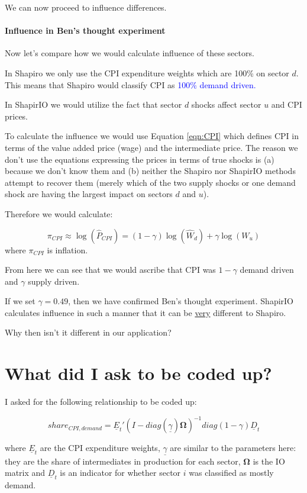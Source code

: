 \documentclass[12pt,english]{article}
\begin{document}
We can now proceed to influence differences.

\paragraph{Influence in Ben's thought experiment}

Now let's compare how we would calculate influence of these sectors.

In Shapiro we only use the CPI expenditure weights which are 100\% on sector $d$. This means that Shapiro would classify CPI as \textcolor{blue}{100\% demand driven.}

In ShapirIO we would utilize the fact that sector $d$ shocks affect sector $u$ and CPI prices. 

To calculate the influence we would use Equation \ref{eqn:CPI} which defines CPI in terms of the value added price (wage) and the intermediate price. The reason we don't use the equations expressing the prices in terms of true shocks is (a) because we don't know them and (b) neither the Shapiro nor ShapirIO methods attempt to recover them (merely which of the two supply shocks or one demand shock are having the largest impact on sectors $d$ and $u$). 

Therefore we would calculate:

\[
\pi_{CPI} \approx \log(\hat{P}_{CPI}) = (1-\gamma)\log(\hat{W}_d) + \gamma \log(W_u)
\]
where $\pi_{CPI}$ is inflation.

From here we can see that we would ascribe that CPI was $1-\gamma$ demand driven and $\gamma$ supply driven.

If we set $\gamma=0.49$, then we have confirmed Ben's thought experiment. ShapirIO calculates influence in such a manner that it can be \underline{very} different to Shapiro.

Why then isn't it different in our application? 

\section*{What did I ask to be coded up?}

I asked for the following relationship to be coded up:

\[
share_{CPI,demand}= \underline{E}_t' (I-diag(\underline{\gamma})\mathbf{\Omega})^{-1} diag(1-\gamma) \underline{D}_t
\]

where $\underline{E}_t$ are the CPI expenditure weights, $\underline{\gamma}$ are similar to the parameters here: they are the share of intermediates in production for each sector, $\mathbf{\Omega}$ is the IO matrix and $\underline{D}_t$ is an indicator for whether sector $i$ was classified as mostly demand.
\end{document}
